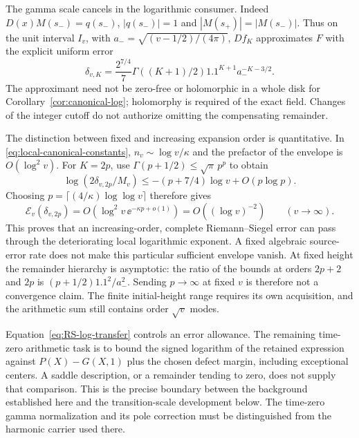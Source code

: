 The gamma scale cancels in the logarithmic consumer. Indeed
\(D(x)M(s_-)=q(s_-)\), \(|q(s_-)|=1\) and
\(|M(s_+)|=|M(s_-)|\). Thus on the unit interval \(I_v\), with
\(a_- =\sqrt{(v-1/2)/(4\pi)}\), \(D f_K\) approximates \(F\) with
the explicit uniform error
\begin{equation}\label{eq:RS-normalized-error}
 \delta_{v,K}=\frac{2^{7/4}}7
       \Gamma((K+1)/2)1.1^{K+1}a_-^{-K-3/2}.
\end{equation}
The approximant need not be zero-free or holomorphic in a whole disk
for Corollary~\ref{cor:canonical-log}; holomorphy is required of the
exact field. Changes of the integer cutoff do not authorize omitting
the compensating remainder.

The distinction between fixed and increasing expansion order is
quantitative. In \eqref{eq:local-canonical-constants},
\(n_v\sim\log v/\kappa\) and the prefactor of the envelope is
\(O(\log^2v)\). For \(K=2p\), use
\(\Gamma(p+1/2)\le\sqrt\pi\,p^p\) to obtain
\[
 \log(2\delta_{v,2p}/M_v)
 \le-(p+7/4)\log v+O(p\log p).
\]
Choosing \(p=\lceil(4/\kappa)\log\log v\rceil\) therefore gives
\begin{equation}\label{eq:RS-log-transfer}
 \mathcal E_v(\delta_{v,2p})
 =O(\log^2v\,\ee^{-\kappa p+o(1)})=O((\log v)^{-2})
 \qquad(v\to\infty).
\end{equation}
This proves that an increasing-order, complete Riemann--Siegel error
can pass through the deteriorating local logarithmic exponent. A
fixed algebraic source-error rate does not make this particular
sufficient envelope vanish. At fixed height the remainder hierarchy
is asymptotic: the ratio of the bounds at orders \(2p+2\) and \(2p\)
is \((p+1/2)1.1^2/a_-^2\). Sending \(p\to\infty\) at fixed \(v\)
is therefore not a convergence claim. The finite initial-height range
requires its own acquisition, and the arithmetic sum still contains
order \(\sqrt v\) modes.

Equation~\eqref{eq:RS-log-transfer} controls an error allowance. The
remaining time-zero arithmetic task is to bound the signed logarithm of the
retained expression against \(P(X)-G(X,1)\) plus the chosen defect margin, including exceptional
centers. A saddle description, or a remainder tending to zero, does
not supply that comparison. This is the precise boundary between the
background established here and the transition-scale development below.
The time-zero gamma normalization and its pole correction must be
distinguished from the harmonic carrier used there.
